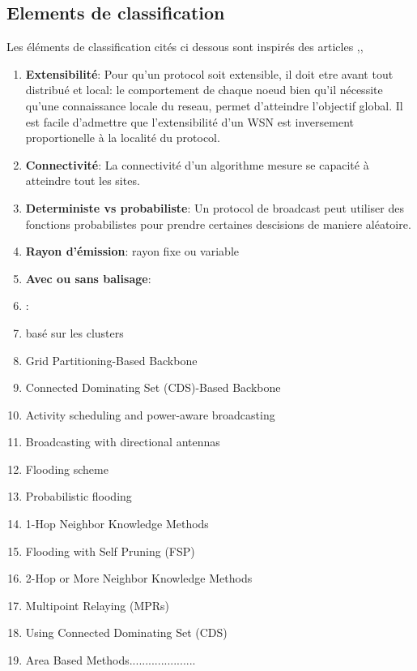 \subsection{Elements de classification}
Les éléments de classification cités ci dessous sont inspirés des articles \cite{stojmenovic2004},\cite{ingelrest2005},\cite{wu2003}
\begin{enumerate}
 \item  \textbf{Extensibilité}: Pour qu'un protocol soit extensible, il doit etre avant tout distribué et local: le comportement de chaque noeud bien qu'il
nécessite qu'une connaissance locale du reseau, permet d'atteindre l'objectif global. Il est facile d'admettre que l'extensibilité d'un WSN est inversement proportionelle à la localité du protocol. 
 \item  \textbf{Connectivité}: La connectivité d'un algorithme mesure se capacité à atteindre tout les sites.
 \item  \textbf{Deterministe vs probabiliste}: Un protocol de broadcast peut utiliser des fonctions probabilistes pour prendre certaines descisions de maniere aléatoire.
 \item  \textbf{Rayon d'émission}:  rayon fixe ou variable
 \item  \textbf{Avec ou sans balisage}:  
 \item  \textbf{}:  
 \item  basé sur les clusters
 \item  Grid Partitioning-Based Backbone
 \item  Connected Dominating Set (CDS)-Based Backbone
 \item  Activity scheduling and power-aware broadcasting
 \item  Broadcasting with directional antennas
 \item  Flooding scheme 
 \item  Probabilistic flooding
 \item  1-Hop Neighbor Knowledge Methods
 \item  Flooding with Self Pruning (FSP)
 \item  2-Hop or More Neighbor Knowledge Methods
 \item  Multipoint Relaying (MPRs)
 \item  Using Connected Dominating Set (CDS)
 \item  Area Based Methods.....................
 
\end{enumerate}


\newpage
